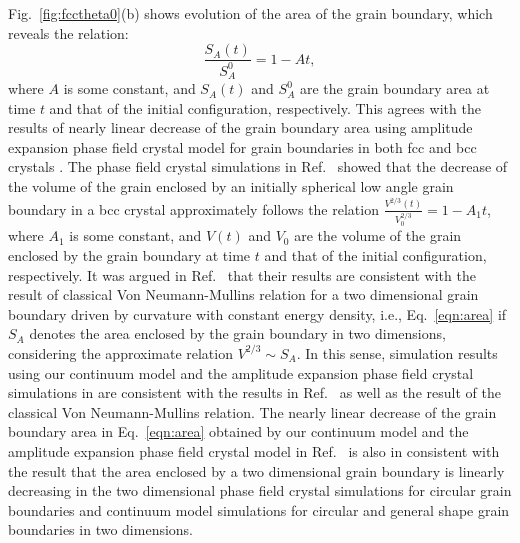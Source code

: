 Fig.~\ref{fig:fcctheta0}(b) shows evolution of the area of the grain boundary, which  reveals the relation:
\begin{equation}
\frac{S_A(t)}{S_A^0}=1-At,
\label{eqn:area}
\end{equation}
where $A$ is some constant, and $S_A(t)$ and $S_A^0$ are the grain boundary area at time $t$ and that of the initial configuration, respectively. This agrees with the results of nearly linear decrease of the grain boundary area using amplitude expansion phase field crystal model for grain boundaries in both fcc and bcc crystals \cite{salvalaglio2018defects}.
The phase field crystal simulations in Ref.~\cite{yamanaka2017phase} showed that the decrease of the volume of the grain enclosed by an initially spherical low angle grain boundary in a bcc crystal approximately follows the relation $\frac{V^{2/3}(t)}{V_0^{2/3}}=1- A_1t$, where $A_1$ is some constant,   and $V(t)$ and $V_0$ are the volume of the grain enclosed by the grain boundary at time $t$ and that of the initial configuration, respectively. It was argued in  Ref.~\cite{yamanaka2017phase} that their results are consistent with the result of classical Von Neumann-Mullins relation \cite{mullins1956two} for a two dimensional grain boundary driven by curvature with constant energy density, i.e., Eq.~\eqref{eqn:area} if $S_A$ denotes the area enclosed by the grain boundary in two dimensions, considering the approximate relation $V^{2/3}\sim S_A$.
In this sense, simulation results using our continuum model and the amplitude expansion phase field crystal simulations in \cite{salvalaglio2018defects} are consistent with the results in  Ref.~\cite{yamanaka2017phase} as well as the result of the classical Von Neumann-Mullins relation. The nearly linear decrease of the grain boundary area in Eq.~\eqref{eqn:area} obtained by our continuum model and the amplitude expansion phase field crystal model in Ref.~\cite{salvalaglio2018defects} is also in consistent with the result that the area enclosed by a two dimensional grain boundary is linearly decreasing in the two dimensional phase field crystal simulations for circular grain boundaries \cite{wu2012phase} and continuum model simulations for circular \cite{zhang2018motion} and general shape \cite{zhang2019new} grain boundaries in two dimensions.




